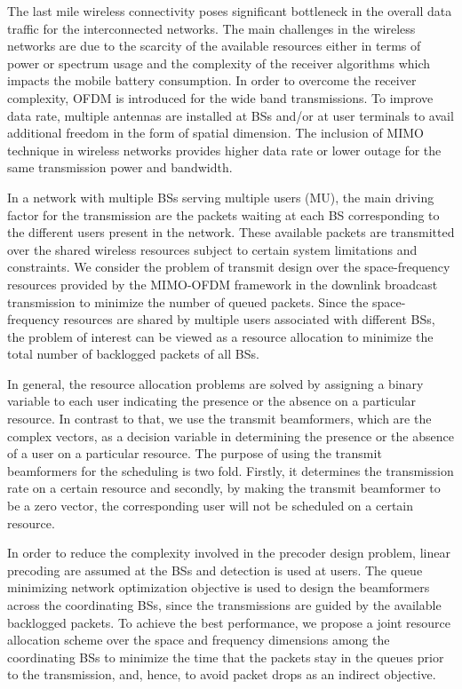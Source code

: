 
The last mile wireless connectivity poses significant bottleneck in the overall data traffic for the interconnected networks. The main challenges in the wireless networks are due to the scarcity of the available resources either in terms of power or spectrum usage and the complexity of the receiver algorithms which impacts the mobile battery consumption. In order to overcome the receiver complexity, \ac{OFDM} is introduced for the wide band transmissions. To improve data rate, multiple antennas are installed at \acp{BS} and/or at user terminals to avail additional freedom in the form of spatial dimension. The inclusion of \ac{MIMO} technique in wireless networks provides higher data rate or lower outage for the same transmission power and bandwidth.

In a network with multiple \acp{BS} serving multiple users (\acs{MU}), the main driving factor for the transmission are the packets waiting at each \ac{BS} corresponding to the different users present in the network. These available packets are transmitted over the shared wireless resources subject to certain system limitations and constraints. We consider the problem of transmit design over the space-frequency resources provided by the \acs{MIMO}-\ac{OFDM} framework in the downlink broadcast transmission to minimize the number of queued packets. Since the space-frequency resources are shared by multiple users associated with different \acp{BS}, the problem of interest can be viewed as a resource allocation to minimize the total number of backlogged packets of all \acp{BS}.

In general, the resource allocation problems are solved by assigning a binary variable to each user indicating the presence or the absence on a particular resource. In contrast to that, we use the transmit beamformers, which are the complex vectors, as a decision variable in determining the presence or the absence of a user on a particular resource. The purpose of using the transmit beamformers for the scheduling is two fold. Firstly, it determines the transmission rate on a certain resource and secondly, by making the transmit beamformer to be a zero vector, the corresponding user will not be scheduled on a certain resource.

In order to reduce the complexity involved in the precoder design problem, linear precoding are assumed at the \acp{BS} and detection is used at users. The queue minimizing network optimization objective is used to design the beamformers across the coordinating \acp{BS}, since the transmissions are guided by the available backlogged packets. To achieve the best performance, we propose a joint resource allocation scheme over the space and frequency dimensions among the coordinating \acp{BS} to minimize the time that the packets stay in the queues prior to the transmission, and, hence, to avoid packet drops as an indirect objective.


